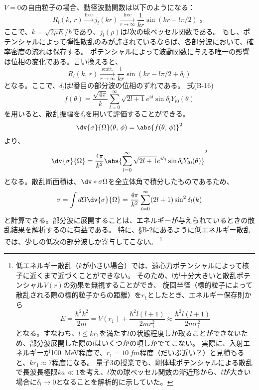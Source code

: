 \documentclass[a4paper,11pt,uplatex]{jsarticle}
\begin{document}
$V=0$の自由粒子の場合、動径波動関数は以下のようになる：
\begin{equation}
  R_l(k,\,r)\xrightarrow[]{\text{free}} j_l(kr)\xrightarrow[r\to\infty]{\text{free}} \frac{1}{kr}\sin(kr-l\pi/2)\;。
\end{equation}
ここで、$k=\sqrt{2\mu E}/\hbar$であり、$j_l(\rho)$は$l$次の球ベッセル関数である。
もし、ポテンシャルによって弾性散乱のみが許されているならば、各部分波において、確率密度の流れは保存する。
ポテンシャルによって波動関数に与える唯一の影響は位相の変化である。言い換えると、
\begin{equation}
  R_l(k,\,r)\xrightarrow[r\to\infty]{\text{scatt.}} \frac{1}{kr}\sin(kr-l\pi/2+\delta_l)
\end{equation}
となる。ここで、$\delta_l$は$l$番目の部分波の位相のずれである。
式(B-16)
\begin{equation}
  f(\theta)=\frac{\sqrt{4\pi}}{k}\sum_{l=0}^{\infty}\sqrt{2l+1}e^{i\delta}\sin\delta_l Y_{l0}(\theta)
\end{equation}
を用いると、散乱振幅を$\delta_l$を用いて評価することができる。
\begin{equation}
  \dv{\sigma}{\Omega}(\theta,\,\phi)=\abs{f(\theta,\,\phi)}^2
\end{equation}
より、
\begin{equation}
  \dv{\sigma}{\Omega} = \frac{4\pi}{k^2}\abs{\sum_{l=0}^{\infty}\sqrt{2l+1}e^{i\delta_l}\sin\delta_l Y_{l0}(\theta)}^2
\end{equation}
となる。散乱断面積は、$\dv*{\sigma}{\Omega}$を全立体角で積分したものであるため、
\begin{equation}
  \sigma=\int d\Omega \dv{\sigma}{\Omega} = \frac{4\pi}{k^2}\sum_{l=0}^{\infty}(2l+1)\sin^2\delta_l(k)
\end{equation}
と計算できる。部分波に展開することは、エネルギーが与えられているときの散乱結果を解析するのに有益である。
特に、\S{B-2}にあるように低エネルギー散乱では、少しの低次の部分波しか寄与してこない。
\footnote{低エネルギー散乱（$k$が小さい場合）では、遠心力ポテンシャルによって核子に近くまで近づくことができない。
  そのため、$l$が十分大きいと散乱ポテンシャル$V(r)$の効果を無視することができ、
  旋回半径（標的粒子によって散乱される際の標的粒子からの距離）を$r_1$としたとき、エネルギー保存則から
  \begin{equation}
    E=\frac{\hbar^2k^2}{2m} = V(r_1)+ \frac{\hbar^2l(l+1)}{2mr_1^2} \approx \frac{\hbar^2l(l+1)}{2mr_1^2}
  \end{equation}
  となる。すなわち、$l\leq kr_1$を満たす$l$の状態程度しか取ることができないため、部分波展開した際の$l$はいくつかの項しかでてこない。
  実際に、入射エネルギーが\SI{100}{MeV}程度で、$r_1=\SI{10}{fm}$程度（だいぶ近い？）と見積もると、$kr_1\approx 7$程度になる。
  量子3の授業でも、剛体球ポテンシャルによる散乱で長波長極限$ka\ll 1$を考え、$l$次の球ベッセル関数の漸近形から、$l$が大きい場合に$\delta_l\to0$となることを解析的に示していた。
}
\end{document}
